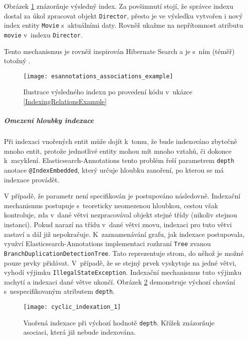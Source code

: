 \documentclass[11pt,oneside]{fithesis2}
\begin{document}
Obrázek \ref{IndexingRelationsExampleResult} znázorňuje výsledný index. Za povšimnutí stojí, že správce indexu dostal za úkol zpracovat objekt \texttt{Director}, přesto je ve výsledku vytvořen i nový index entity \texttt{Movie} s~aktuálními daty. Rovněž ukažme na nepřítomnost atributu \texttt{movie} v~indexu \texttt{Director}. 

Tento mechanismus je rovněž inspirován Hibernate Search a je s~ním (téměř) totožný \cite[str. 110]{HibernateSearchAction}. 

\begin{figure}[t]
	\begin{center}
		\texttt{[image: esannotations\_associations\_example]}
	\end{center}
	\caption{Ilustrace výsledného indexu po provedení kódu v~ukázce \ref{IndexingRelationsExample}}	
	\label{IndexingRelationsExampleResult}
\end{figure}

\subparagraph{Omezení hloubky indexace} Při indexaci vnořených entit může dojít k~tomu, že bude indexováno zbytečně mnoho entit, protože jednotlivé entity mohou mít mnoho vztahů, či dokonce k~zacyklení. Elasticsearch-Annotations tento problém řeší parametrem \texttt{depth} anotace \texttt{@IndexEmbedded}, který určuje hloubku zanoření, po kterou se má indexace provádět. 

V případě, že parametr není specifikován je postupováno následovně. Indexační mechanismus postupuje s~teoreticky neomezenou hloubkou, cestou však kontroluje, zda v~dané větvi nezpracovával objekt stejné třídy (nikoliv stejnou instanci). Pokud narazí na třídu v~dané větvi znovu, indexaci pro tuto větvi zastaví a dál již nepokračuje. K~zaznamenávání grafu, jak indexace postupovala, využví Elasticsearch-Annotations implementaci rozhraní \texttt{Tree} zvanou \texttt{BranchDuplicationDetectionTree}. Tato reprezentuje strom, do něhož je možné pouze prvky přidávat. V~případě, že se stejný prvek vyskytuje na jedné větvi, vyhodí výjimku \texttt{IllegalStateException}. Indexační mechanismus tuto výjimku zachytí a indexaci dané větve ukončí. Obrázek \ref{CyclicIndexation1} demonstruje výchozí chování s~nespecifikovaným atributem \texttt{depth}. 

\begin{figure}[htb]
	\begin{center}
		\texttt{[image: cyclic\_indexation\_1]}
	\end{center}
	\caption{Vnořená indexace při výchozí hodnotě \texttt{depth}. Křížek znázorňuje asociaci, která již nebude indexována.}	
	\label{CyclicIndexation1}
\end{figure}
\end{document}
